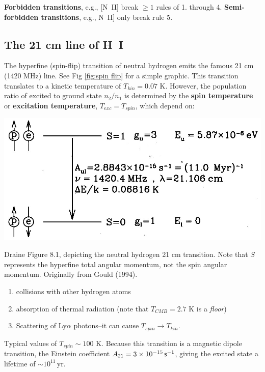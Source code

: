 \documentclass{tufte-handout}
\renewcommand{\textbf}[1]{{\bf \textcolor{dark-gray}{#1}}}
\renewcommand{\rm}{\sf}
\newcommand{\HI}{\textnormal{H{\smaller~\textsc{I}}}}
\renewcommand{\smallcaps}[1]{{\smaller~\textsc{#1}}}
\begin{document}
\textbf{Forbidden transitions}, e.g., [N\smallcaps{II}] break $\geq 1$ rules of 1. through 4. \textbf{Semi-forbidden transitions}, e.g., N\smallcaps{II}] only break rule 5.

\subsection{The 21 cm line of \HI}

The hyperfine (spin-flip) transition of neutral hydrogen emits the famous 21 cm (1420 MHz) line. See Fig \ref{fig:spin flip} for a simple graphic. This transition translates to a kinetic temperature of $T_{kin} = 0.07$ K. However, the population ratio of excited to ground state $n_2/n_1$ is determined by the \textbf{spin temperature} or \textbf{excitation temperature}, $T_{exc} = T_{spin}$, which depend on:
\begin{marginfigure}
\includegraphics[width=\columnwidth]{ism_figures/Draine_8-1}
\caption{Draine Figure 8.1, depicting the neutral hydrogen 21 cm transition. Note that $S$ represents the hyperfine total angular momentum, not the spin angular momentum. Originally from Gould (1994).}
\label{fig:spin flip}
\end{marginfigure}
\begin{enumerate}
\item collisions with other hydrogen atoms
\item absorption of thermal radiation (note that $T_{CMB} = 2.7$ K is a \textit{floor})
\item Scattering of Ly$\alpha$ photons--it can cause $T_{spin} \rightarrow T_{kin}$.
\end{enumerate}
Typical values of $T_{spin} \sim 100$ K. Because this transition is a magnetic dipole transition, the Einstein coefficient $A_{21} = 3 \times 10^{-15}\rm \, s^{-1}$, giving the excited state a lifetime of $\sim 10^{11}\,$yr.
\end{document}
